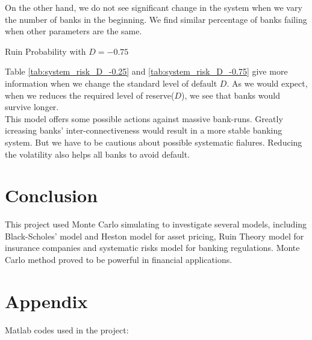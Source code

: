 \documentclass[a4paper,11pt]{article}
\newcommand{\includecode}[1]{}
\begin{document}
On the other hand, we do not see significant change in the system when we vary the number of banks in the beginning. We find similar percentage of banks failing when other parameters are the same.  

\begin{table}[bhtp]
	\centering
	
	\quad
	
	\quad
	
	\caption{Ruin Probability with $D=-0.75$}
	\label{tab:system_risk_D_-0.75}
\end{table}
Table \ref{tab:system_risk_D_-0.25} and \ref{tab:system_risk_D_-0.75} give more information when we change the standard level of default $D$. As we would expect, when we reduces the required level of reserve($D$), we see that banks would survive longer.\\

This model offers some possible actions against massive bank-runs. Greatly icreasing banks' inter-connectiveness would result in a more stable banking system. But we have to be cautious about possible systematic fialures. Reducing the volatility also helps all banks to avoid default. \\

\section{Conclusion}
This project used Monte Carlo simulating to investigate several models, including Black-Scholes' model and Heston model for asset pricing, Ruin Theory model for insurance companies and systematic risks model for banking regulations. Monte Carlo method proved to be powerful in financial applications.\\


\newpage


\section{Appendix}
Matlab codes used in the project:
\includecode{Q1.m}
\includecode{GeometricBrownianMotion.m}
\includecode{CallValue.m}
\includecode{CallPricingByMonteCarlo.m}
\includecode{Q2.m}
\includecode{getHestonSimulation.m}
\includecode{HestonCallPricingByMonteCarlo.m}
\includecode{getImpliedVolatility.m}
\includecode{DownAndOutOptionValue.m}
\includecode{DownAndOutOptionPricingByMonteCarlo.m}
\includecode{DownAndOutOptionPricingBySolvingPDE.m}
\includecode{Q3.m}
\includecode{CompoundPoissonGenerator.m}
\includecode{getU.m}
\includecode{ruinProbSimulation.m}
\includecode{ruinProbSimulationWithSigma.m}
\includecode{getTau.m}
\includecode{getNewU.m}
\includecode{isRuined.m}
\includecode{notRuined.m}
\includecode{RuinProbOutput.m}
\includecode{Q4.m}
\includecode{SystemRiskModel.m}
\includecode{getDefaultTime.m}
\includecode{getNumofDefault.m}
\includecode{DefaultReport.m}
\includecode{saveTightFigure.m}
\end{document}
